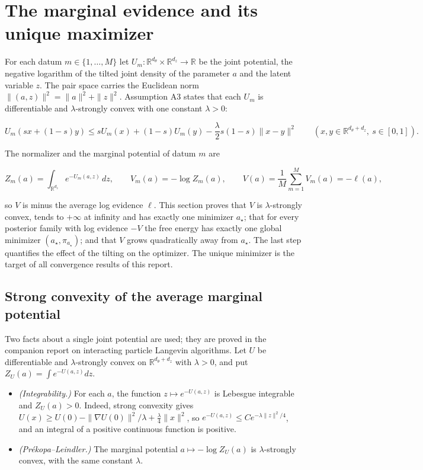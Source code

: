 \documentclass[11pt,a4paper]{report}
\begin{document}
\section{\texorpdfstring{The marginal evidence and its unique maximizer}{The marginal evidence and its unique maximizer}}


For each datum \(m\in\{1,\dots,M\}\) let \(U_m:\mathbb R^{d_\theta}\times\mathbb R^{d_z}\to\mathbb R\) be the joint potential, the negative logarithm of the tilted joint density of the parameter \(a\) and the latent variable \(z\). The pair space carries the Euclidean norm \(\|(a,z)\|^2=\|a\|^2+\|z\|^2\). Assumption A3 states that each \(U_m\) is differentiable and \(\lambda\)-strongly convex with one constant \(\lambda>0\):


\[U_m(sx+(1-s)y)\le sU_m(x)+(1-s)U_m(y)-\frac\lambda2s(1-s)\|x-y\|^2\qquad(x,y\in\mathbb R^{d_\theta+d_z},\ s\in[0,1]).\]


The normalizer and the marginal potential of datum \(m\) are


\[Z_m(a)=\int_{\mathbb R^{d_z}}e^{-U_m(a,z)}\,dz,\qquad V_m(a)=-\log Z_m(a),\qquad V(a)=\frac1M\sum_{m=1}^MV_m(a)=-\ell(a),\]


so \(V\) is minus the average log evidence \(\ell\). This section proves that \(V\) is \(\lambda\)-strongly convex, tends to \(+\infty\) at infinity and has exactly one minimizer \(a_\star\); that for every posterior family with log evidence \(-V\) the free energy has exactly one global minimizer \((a_\star,\pi_{a_\star})\); and that \(V\) grows quadratically away from \(a_\star\). The last step quantifies the effect of the tilting on the optimizer. The unique minimizer is the target of all convergence results of this report.

\subsection{\texorpdfstring{Strong convexity of the average marginal potential}{Strong convexity of the average marginal potential}}


Two facts about a single joint potential are used; they are proved in the companion report on interacting particle Langevin algorithms. Let \(U\) be differentiable and \(\lambda\)-strongly convex on \(\mathbb R^{d_\theta+d_z}\) with \(\lambda>0\), and put \(Z_U(a)=\int e^{-U(a,z)}dz\).



\begin{itemize}


\item \emph{(Integrability.)} For each \(a\), the function \(z\mapsto e^{-U(a,z)}\) is Lebesgue integrable and \(Z_U(a)>0\). Indeed, strong convexity gives \(U(x)\ge U(0)-\|\nabla U(0)\|^2/\lambda+\frac\lambda4\|x\|^2\), so \(e^{-U(a,z)}\le Ce^{-\lambda\|z\|^2/4}\), and an integral of a positive continuous function is positive.

\item \emph{(Prékopa–Leindler.)} The marginal potential \(a\mapsto-\log Z_U(a)\) is \(\lambda\)-strongly convex, with the same constant \(\lambda\).

\end{itemize}
\end{document}
